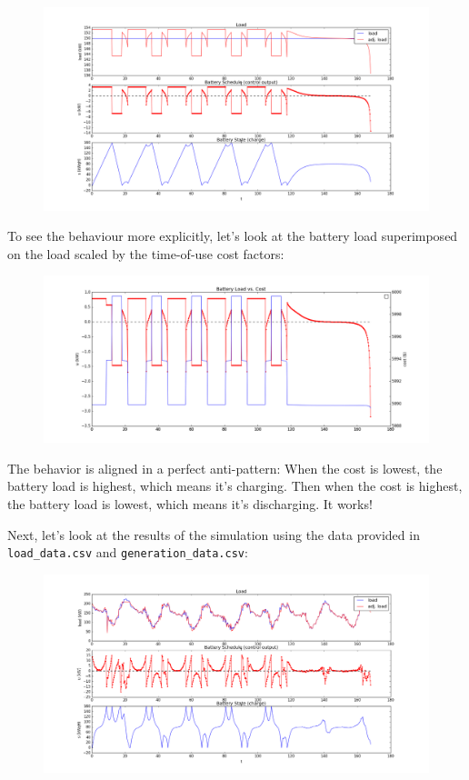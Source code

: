 \documentclass[12pt]{article}
\begin{document}
\begin{figure}[h]
\includegraphics[width=\textwidth]{basicsummary}
\end{figure}
To see the behaviour more explicitly, let's look at the battery load superimposed on the load scaled by the time-of-use cost factors:
\begin{figure}[h]
\includegraphics[width=\textwidth]{loadVcost}
\end{figure}
The behavior is aligned in a perfect anti-pattern: When the cost is lowest, the battery load is highest, which means it's charging. Then when the cost is highest, the battery load is lowest, which means it's discharging. It works!

Next, let's look at the results of the simulation using the data provided in \texttt{load\_data.csv} and \texttt{generation\_data.csv}:
\begin{figure}[H]
\includegraphics[width=\textwidth]{realdatasummary}
\end{figure}
\end{document}
